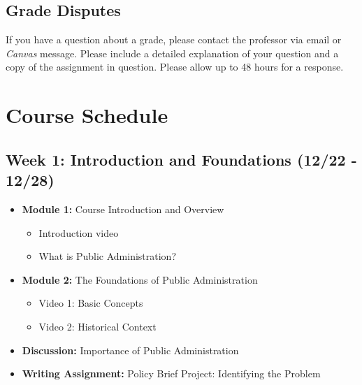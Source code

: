 \documentclass[11pt, letterpaper]{article}
\begin{document}
\subsection*{Grade Disputes}

If you have a question about a grade, please contact the professor via email or \emph{Canvas} message. Please include a detailed explanation of your question and a copy of the assignment in question. Please allow up to 48 hours for a response. 

\section*{Course Schedule}

\subsection*{Week 1: Introduction and Foundations (12/22 - 12/28)}

\begin{itemize}
    \item \textbf{Module 1:} Course Introduction and Overview
        \begin{itemize}
            \item Introduction video
            \item What is Public Administration?
        \end{itemize}
    \item \textbf{Module 2:} The Foundations of Public Administration
        \begin{itemize}
            \item Video 1: Basic Concepts
            \item Video 2: Historical Context
        \end{itemize}
    \item \textbf{Discussion:} Importance of Public Administration
    \item \textbf{Writing Assignment:} Policy Brief Project: Identifying the Problem
\end{itemize}
\end{document}
